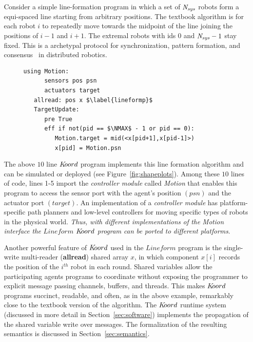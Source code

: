 Consider a simple line-formation program in which a set of $\mathit{N_{sys}}$ robots form a equi-spaced line starting from arbitrary positions. The textbook algorithm is for each robot $i$ to repeatedly move towards the midpoint of the line joining the positions of $i-1$ and $i+1$. The extremal robots with ids $0$ and $\mathit{N_{sys}} -1$ stay fixed. This is a archetypal protocol for synchronization, pattern formation, and consensus~\cite{Tsitsiklis:1986,Blondel,Magnusbook2010,Fax} in distributed robotics.
%
\begin{figure}
\begin{lstlisting}[label=lineform,caption=Lineform $\lgname$ program]
   using Motion:
      sensors pos psn
      actuators target
   allread: pos x $\label{lineformp}$
   TargetUpdate:
      pre True
      eff if not(pid == $\NMAX$ - 1 or pid == 0):
         Motion.target = mid(<x[pid+1],x[pid-1]>)
         x[pid] = Motion.psn
\end{lstlisting}
\end{figure}
The above $10$ line  $K\kern-2pt oord$ program implements this line formation algorithm and can be simulated or deployed (see Figure~\ref{fig:shapeplots}). Among these $10$ lines of code, lines 1-5 import the {\em controller module\/} called {\em Motion\/} that enables this program to access the sensor port with the agent's position $(\mathit{psn})$ and the actuator port $(\mathit{target})$. An implementation of  a {\em controller module\/} has platform-specific path planners and low-level controllers for moving specific types of robots in the physical world. {\em Thus, with different implementations of the {\em Motion\/} interface the $\mathit{Lineform}$ $K\kern-2pt oord$  program can be ported to different platforms\/}. 

Another powerful feature of $K\kern-2pt oord$ used in the $\mathit{Lineform}$ program is the single-write multi-reader ({\bf allread}) shared array $x$, in which component $x[i]$ records the position of the $i^{th}$ robot in each round.  Shared variables allow the participating agents programs to coordinate without exposing the programmer to explicit message passing channels, buffers, and threads. This makes $K\kern-2pt oord$ programs succinct, readable, and often, as in the  above example, remarkably close to the textbook version of the algorithm. The $K\kern-2pt oord$ runtime system (discussed in more detail in Section~\ref{sec:software}) implements the propagation of  the shared variable write over messages. The formalization of the resulting semantics is discussed in Section~\ref{sec:semantics}.

